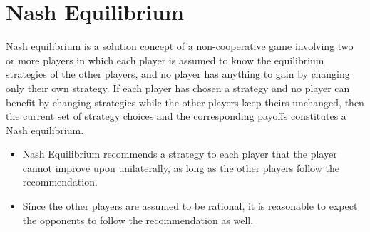\documentclass[a4paper,12pt]{article}
\begin{document}
\section{Nash Equilibrium}
Nash equilibrium is a solution concept of a non-cooperative game involving two or more players in which each player is assumed to know the equilibrium strategies of the other players, and no player has anything to gain by changing only their own strategy.
If each player has chosen a strategy and no player can benefit by changing strategies while the other players keep theirs unchanged, then the current set of strategy choices and the corresponding payoffs constitutes a Nash equilibrium. 

\begin{framed}
\begin{itemize}
\item Nash Equilibrium recommends a strategy to each player that the player cannot improve upon unilaterally, as long as the other players follow the recommendation.
\item Since the other players are assumed to be rational, it is reasonable to expect the opponents to follow the recommendation as well.
\end{itemize}
\end{framed}

\end{document}
